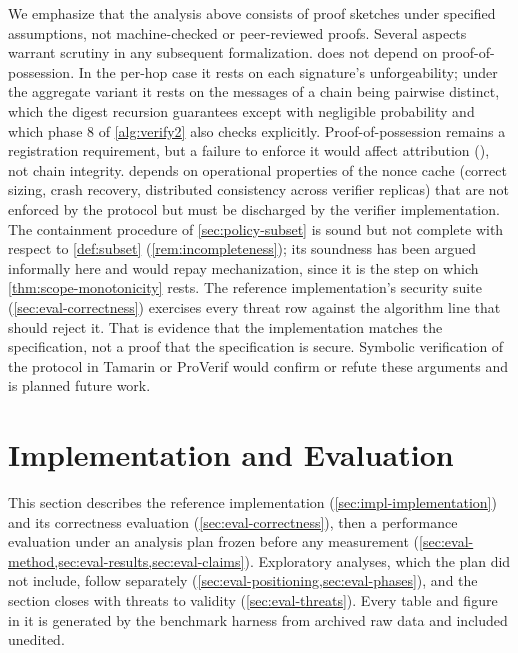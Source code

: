 \documentclass[11pt,a4paper]{article}
\begin{document}
We emphasize that the analysis above consists of proof sketches under
specified assumptions, not machine-checked or peer-reviewed proofs.
Several aspects warrant scrutiny in any subsequent formalization.
 does not depend on proof-of-possession. In
the per-hop case it rests on each signature's unforgeability; under the
aggregate variant it rests on the messages of a chain being pairwise
distinct, which the digest recursion guarantees except with negligible
probability and which phase 8 of \cref{alg:verify2} also checks
explicitly. Proof-of-possession remains a registration requirement, but
a failure to enforce it would affect attribution (), not
chain integrity. 
depends on operational properties of the nonce cache (correct sizing,
crash recovery, distributed consistency across verifier replicas)
that are not enforced by the protocol but must be discharged by the
verifier implementation. The containment procedure of
\cref{sec:policy-subset} is sound but not complete with respect to
\cref{def:subset} (\cref{rem:incompleteness}); its soundness has been
argued informally here and would repay mechanization, since it is the
step on which \cref{thm:scope-monotonicity} rests.
The reference implementation's security suite
(\cref{sec:eval-correctness}) exercises every threat row against the
algorithm line that should reject it. That is evidence that the
implementation matches the specification, not a proof that the
specification is secure. Symbolic verification of the protocol in
Tamarin or ProVerif would confirm or refute these arguments and is
planned future work.

\section{Implementation and Evaluation}
\label{sec:impl}

This section describes the reference implementation
(\cref{sec:impl-implementation}) and its correctness evaluation
(\cref{sec:eval-correctness}), then a performance evaluation under an
analysis plan frozen before any measurement
(\cref{sec:eval-method,sec:eval-results,sec:eval-claims}). Exploratory
analyses, which the plan did not include, follow separately
(\cref{sec:eval-positioning,sec:eval-phases}), and the section closes
with threats to validity (\cref{sec:eval-threats}). Every table and
figure in it is generated by the benchmark harness from archived raw
data and included unedited.
\end{document}
